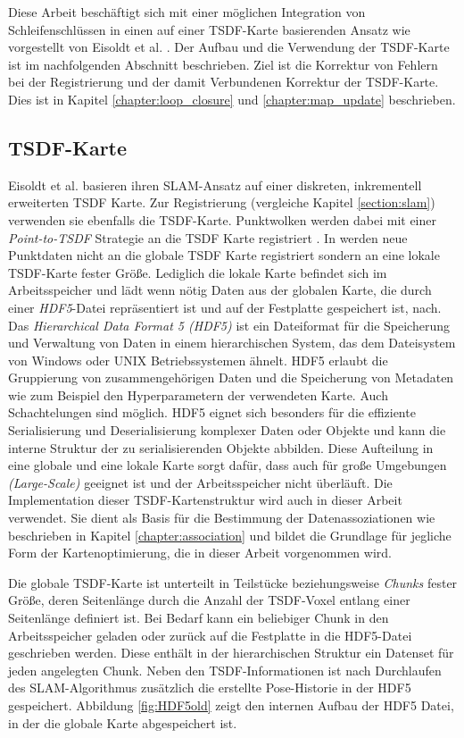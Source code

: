 Diese Arbeit beschäftigt sich mit einer möglichen Integration von Schleifenschlüssen in einen auf einer TSDF-Karte basierenden Ansatz wie vorgestellt von Eisoldt et al. \cite{HATSDF}. Der Aufbau und die Verwendung der TSDF-Karte ist im nachfolgenden Abschnitt beschrieben. Ziel ist die Korrektur von Fehlern bei der Registrierung und der damit Verbundenen Korrektur der TSDF-Karte. Dies ist in Kapitel \ref{chapter:loop_closure} und \ref{chapter:map_update} beschrieben.

\subsection{TSDF-Karte}
\label{section:tsdf_map}

Eisoldt et al. \cite{HATSDF} basieren ihren SLAM-Ansatz auf einer diskreten, inkrementell erweiterten TSDF Karte. Zur Registrierung (vergleiche Kapitel \ref{section:slam}) verwenden sie ebenfalls die TSDF-Karte. Punktwolken werden dabei mit einer \emph{Point-to-TSDF} Strategie an die TSDF Karte registriert \cite{HATSDF}.
In \cite{HATSDF} werden neue Punktdaten nicht an die globale TSDF Karte registriert sondern an eine lokale TSDF-Karte fester Größe. Lediglich die lokale Karte befindet sich im Arbeitsspeicher und lädt wenn nötig Daten aus der globalen Karte, die durch einer \emph{HDF5}-Datei repräsentiert ist und auf der Festplatte gespeichert ist, nach. Das \emph{Hierarchical Data Format 5 (HDF5)} \cite{hdf5} ist ein Dateiformat für die Speicherung und Verwaltung von Daten in einem hierarchischen System, das dem Dateisystem von Windows oder UNIX Betriebssystemen ähnelt. HDF5 erlaubt die Gruppierung von zusammengehörigen Daten und die Speicherung von Metadaten wie zum Beispiel den Hyperparametern der verwendeten Karte. Auch Schachtelungen sind möglich. HDF5 eignet sich besonders für die effiziente Serialisierung und Deserialisierung komplexer Daten oder Objekte und kann die interne Struktur der zu serialisierenden Objekte abbilden.
Diese Aufteilung in eine globale und eine lokale Karte sorgt dafür, dass \cite{HATSDF} auch für große Umgebungen \emph{(Large-Scale)} geeignet ist und der Arbeitsspeicher nicht überläuft. Die Implementation dieser TSDF-Kartenstruktur wird auch in dieser Arbeit verwendet. Sie dient als Basis für die Bestimmung der Datenassoziationen wie beschrieben in Kapitel \ref{chapter:association} und bildet die Grundlage für jegliche Form der Kartenoptimierung, die in dieser Arbeit vorgenommen wird.

Die globale TSDF-Karte ist unterteilt in Teilstücke beziehungsweise \emph{Chunks} fester Größe, deren Seitenlänge durch die Anzahl der TSDF-Voxel entlang einer Seitenlänge definiert ist. Bei Bedarf kann ein beliebiger Chunk in den Arbeitsspeicher geladen oder zurück auf die Festplatte in die HDF5-Datei geschrieben werden. Diese enthält in der hierarchischen Struktur ein Datenset für jeden angelegten Chunk. Neben den TSDF-Informationen ist nach Durchlaufen des SLAM-Algorithmus zusätzlich die erstellte Pose-Historie in der HDF5 gespeichert.
Abbildung \ref{fig:HDF5old} zeigt den internen Aufbau der HDF5 Datei, in der die globale Karte abgespeichert ist.

